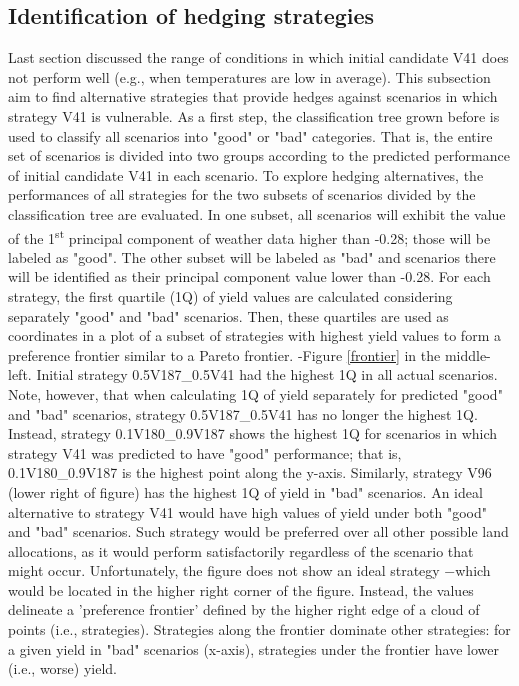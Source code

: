 \documentclass[syngen,nonblindrev]{informs3-syngen}
\begin{document}
\subsection{Identification of hedging strategies} 

Last section discussed the range of conditions in which initial candidate V41 does not perform well (e.g., when temperatures are low in average). 
This subsection aim to find alternative strategies that provide hedges against scenarios in which strategy V41 is vulnerable.
As a first step, the classification tree grown before is used to classify all scenarios into "good" or "bad" categories. 
That is, the entire set of scenarios is divided into two groups according to the predicted performance of initial candidate V41 in each scenario. 
To explore hedging alternatives, the performances of all strategies for the two subsets of scenarios divided by the classification tree are evaluated.
In one subset, all scenarios will exhibit the value of the 1\textsuperscript{st} principal component of weather data higher than -0.28; those will be labeled as "good".
The other subset will be labeled as "bad" and scenarios there will be identified as their principal component value lower than -0.28. 
For each strategy, the first quartile (1Q) of yield values are calculated considering separately "good" and "bad" scenarios. 
Then, these quartiles are used as coordinates in a plot of a subset of strategies with highest yield values to form a preference frontier similar to a Pareto frontier. -Figure \ref{frontier} in the middle-left.
Initial strategy 0.5V187\_0.5V41 had the highest 1Q in all actual scenarios. 
Note, however, that when calculating 1Q of yield separately for predicted "good" and "bad" scenarios, strategy 0.5V187\_0.5V41 has no longer the highest 1Q. 
Instead, strategy 0.1V180\_0.9V187 shows the highest 1Q for scenarios in which strategy V41 was predicted to have "good" performance; that is, 0.1V180\_0.9V187 is the highest point along the y-axis. 
Similarly, strategy V96 (lower right of figure) has the highest 1Q of yield in "bad" scenarios.
An ideal alternative to strategy V41 would have high values of yield under both "good" and "bad" scenarios. 
Such strategy would be preferred over all other possible land allocations, as it would perform satisfactorily regardless of the scenario that might occur. 
Unfortunately, the figure does not show an ideal strategy −which would be located in the higher right corner of the figure. 
Instead, the values delineate a 'preference frontier' defined by the higher right edge of a cloud of points (i.e., strategies). 
Strategies along the frontier dominate other strategies: for a given yield in "bad" scenarios (x-axis), strategies under the frontier have lower (i.e., worse) yield.
\end{document}
